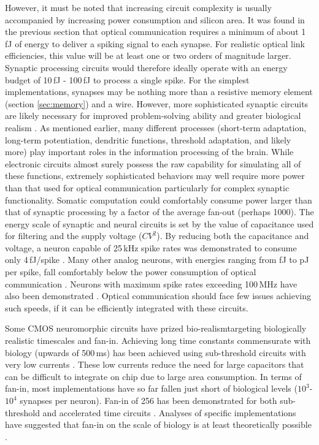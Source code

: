 \documentclass[twocolumn]{article}
\begin{document}
However, it must be noted that increasing circuit complexity is usually accompanied by increasing power consumption and silicon area. It was found in the previous section that optical communication requires a minimum of about 1\,fJ of energy to deliver a spiking signal to each synapse. For realistic optical link efficiencies, this value will be at least one or two orders of magnitude larger. Synaptic processing circuits would therefore ideally operate with an energy budget of 10\,fJ - 100\,fJ to process a single spike. For the simplest implementations, synapses may be nothing more than a resistive memory element (section \ref{sec:memory}) and a wire. However, more sophisticated synaptic circuits are likely necessary for improved problem-solving ability and greater biological realism \cite{chicca2020recipe}. As mentioned earlier, many different processes (short-term adaptation, long-term potentiation, dendritic functions, threshold adaptation, and likely more) play important roles in the information processing of the brain. While electronic circuits almost surely possess the raw capability for simulating all of these functions, extremely sophisticated behaviors may well require more power than that used for optical communication \textemdash particularly for complex synaptic functionality. Somatic computation could comfortably consume power larger than that of synaptic processing by a factor of the average fan-out (perhaps 1000). The energy scale of synaptic and neural circuits is set by the value of capacitance used for filtering and the supply voltage ($CV^{2}$). By reducing both the capacitance and voltage, a neuron capable of 25\,kHz spike rates was demonstrated to consume only 4\,fJ/spike \cite{sourikopoulos20174}. Many other analog neurons, with energies ranging from fJ to pJ per spike, fall comfortably below the power consumption of optical communication \cite{indiveri2019importance}. Neurons with maximum spike rates exceeding 100\,MHz have also been demonstrated \cite{schemmel2020accelerated}. Optical communication should face few issues achieving such speeds, if it can be efficiently integrated with these circuits.

Some CMOS neuromorphic circuits have prized bio-realism\textemdash targeting biologically realistic timescales and fan-in. Achieving long time constants commensurate with biology (upwards of 500\,ms) has been achieved using sub-threshold circuits with very low currents \cite{indiveri2011neuromorphic}. These low currents reduce the need for large capacitors that can be difficult to integrate on chip due to large area consumption. In terms of fan-in, most implementations have so far fallen just short of biological levels ($10^3$-$10^4$ synapses per neuron). Fan-in of 256 has been demonstrated for both sub-threshold \cite{qiao2015reconfigurable} and accelerated time circuits \cite{schemmel2020accelerated}. Analyses of specific implementations have suggested that fan-in on the scale of biology is at least theoretically possible \cite{dowrick2018fan, akima2014majority}.  
\end{document}
